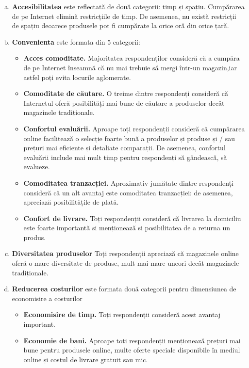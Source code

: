 \documentclass[a4paper, 12pt]{article}
\begin{document}
	\begin{enumerate}[a.]
		
	\item\textbf {Accesibilitatea} este reflectată de două categorii: timp și spațiu. Cumpărarea de pe Internet elimină restricțiile de timp. De asemenea, nu există restricții de spațiu deoarece produsele pot fi cumpărate la orice oră din orice țară.
	\item\textbf{Convenienta} este formata din 5 categorii: 

	\begin{itemize}
		\item\textbf{ Acces comoditate.} Majoritatea respondenților consideră că a cumpăra de pe Internet înseamnă că nu mai trebuie să mergi într-un magazin,iar astfel poți evita locurile aglomerate.
		\item\textbf{Comoditate de căutare.} O treime dintre respondenți consideră că Internetul oferă posibilități mai bune de căutare a produselor decât magazinele tradiționale.
		\item\textbf{Confortul evaluării.} Aproape toți respondenții consideră că cumpărarea online facilitează o selecție foarte bună a produselor și produse și / sau prețuri mai eficiente și detaliate comparații. De asemenea, confortul evaluării include mai mult timp pentru respondenți să gândească, să evalueze.
		\item\textbf{Comoditatea tranzacției.} Aproximativ jumătate dintre respondenți consideră că un alt avantaj este comoditatea tranzacției: de asemenea, apreciază posibilitățile de plată.	
		\item\textbf{Confort de livrare.} Toți respondenții consideră că livrarea la domiciliu este foarte importantă si menționează si posibilitatea de a returna un produs.
	\end{itemize}
		\item\textbf{Diversitatea produselor} Toți respondenții apreciază că magazinele online oferă o mare diversitate de produse, mult mai mare uneori decât magazinele tradiționale.
		\item\textbf{Reducerea costurilor} este formata două categorii pentru dimensiunea de economisire a costurilor
	\begin{itemize}
		\item\textbf{Economisire de timp.} Toți respondenții consideră acest avantaj important.
		\item\textbf{Economie de bani.} Aproape toți respondenții menționează prețuri mai bune pentru produsele online, multe oferte speciale disponibile în mediul online și costul de livrare gratuit sau mic.

\end{itemize}
\end{enumerate}
\end{document}
